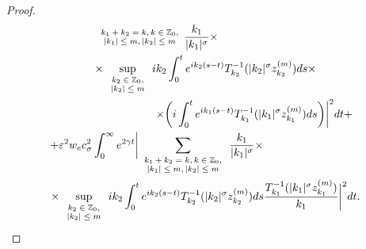 \begin{proof}
\begin{multline*}
{\scriptsize

\begin{array}{c}

k_1+k_2=k, k\in \mathbb Z_0, \\

|k_1|\le m,|k_2|\le m

\end{array}

}\frac{k_1}{|k_1|^\sigma}

\times \hspace{3cm} \;

\\ 

\times

\sup_{\scriptsize \begin{array}{c} k_2\in \mathbb Z_0, \\ |k_2|\le m \end{array}} 

ik_2 \int_0^t e^{ik_2(s-t)}T^{-1}_{k_2}(|k_2|^\sigma z_{k_2}^{(m)})ds 

\times

\\

\;\hspace{3cm}

\times

\biggl(

i\int_0^t e^{ik_1(s-t)}T^{-1}_{k_1}(|k_1|^\sigma z_{k_1}^{(m)})ds \biggr) \biggr|^2dt+

\\

+

\varepsilon^2 w_e c_\sigma^2\int_0^\infty e^{2\gamma t} 

\biggl|

\sum_{

\scriptsize

\begin{array}{c}

k_1+k_2=k, k\in \mathbb Z_0, \\

|k_1|\le m,|k_2|\le m

\end{array}

}\frac{k_1}{|k_1|^\sigma}\times

\hspace{3cm} \;

\\

\times \sup_{\scriptsize \begin{array}{c} k_2\in \mathbb Z_0, \\ |k_2|\le m \end{array}} ik_2 \int_0^t e^{ik_2(s-t)}T^{-1}_{k_2}(|k_2|^\sigma z_{k_2}^{(m)})ds \frac{T^{-1}_{k_1}(|k_1|^\sigma z_{k_1}^{(m)})}{k_1}\biggr|^2dt.


\end{multline*}
\end{proof}
